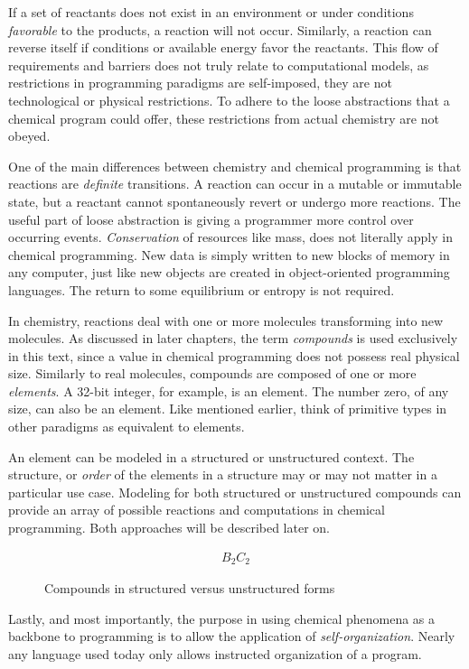 \par If a set of reactants does not exist in an environment or under conditions \textit{favorable} to the products, a reaction will not occur. Similarly, a reaction can reverse itself if conditions or available energy favor the reactants. This flow of requirements and barriers does not truly relate to computational models, as restrictions in programming paradigms are self-imposed, they are not technological or physical restrictions. To adhere to the loose abstractions that a chemical program could offer, these restrictions from actual chemistry are not obeyed. 

\par One of the main differences between chemistry and chemical programming is that reactions are \textit{definite} transitions. A reaction can occur in a mutable or immutable state, but a reactant cannot spontaneously revert or undergo more reactions. The useful part of loose abstraction is giving a programmer more control over occurring events. \textit{Conservation} of resources like mass, does not literally apply in chemical programming. New data is simply written to new blocks of memory in any computer, just like new objects are created in object-oriented programming languages. The return to some equilibrium or entropy is not required.
\par In chemistry, reactions deal with one or more molecules transforming into new molecules. As discussed in later chapters, the term \textit{compounds} is used exclusively in this text, since a value in chemical programming does not possess real physical size. Similarly to real molecules, compounds are composed of one or more \textit{elements}. A 32-bit integer, for example, is an element. The number zero, of any size, can also be an element. Like mentioned earlier, think of primitive types in other paradigms as equivalent to elements.

\par An element can be modeled in a structured or unstructured context. The structure, or \textit{order} of the elements in a structure may or may not matter in a particular use case. Modeling for both structured or unstructured compounds can provide an array of possible reactions and computations in chemical programming. Both approaches will be described later on.

\begin{figure}[h]
   \begin{align*}
   B_2C_2
   \end{align*}
   \begin{center}
     \end{center}
     \caption{Compounds in structured versus unstructured forms}
\end{figure}

\par Lastly, and most importantly, the purpose in using chemical phenomena as a backbone to programming is to allow the application of \textit{self-organization}. Nearly any language used today only allows instructed organization of a program.
